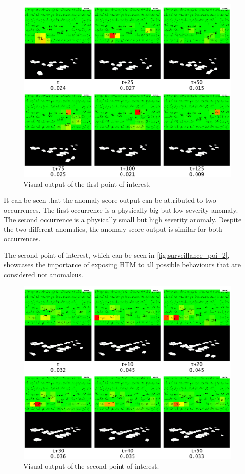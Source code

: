 \begin{figure}[H]
    \centering
    \includegraphics[width=\textwidth]{resources/experiments/surveillance/surveillance_poi_1.png}
    \caption{Visual output of the first point of interest.}
    \label{fig:surveillance_poi_1}
\end{figure}
It can be seen that the anomaly score output can be attributed to two occurrences. The first occurrence is a physically big but low severity anomaly. The second occurrence is a physically small but high severity anomaly. Despite the two different anomalies, the anomaly score output is similar for both occurrences.
\par
The second point of interest, which can be seen in \autoref{fig:surveillance_poi_2}, showcases the importance of exposing HTM to all possible behaviours that are considered not anomalous.
\begin{figure}[H]
    \centering
    \includegraphics[width=\textwidth]{resources/experiments/surveillance/surveillance_poi_2.png}
    \caption{Visual output of the second point of interest.}
    \label{fig:surveillance_poi_2}
\end{figure}
